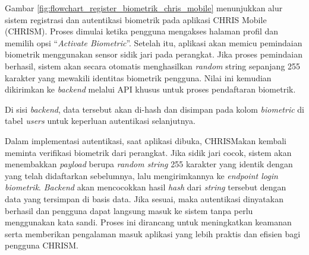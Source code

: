 Gambar \ref{fig:flowchart_register_biometrik_chris_mobile} menunjukkan alur sistem registrasi dan autentikasi biometrik pada aplikasi CHRIS Mobile (CHRISM). Proses dimulai ketika pengguna mengakses halaman profil dan memilih opsi “\textit{Activate Biometric}”. Setelah itu, aplikasi akan memicu pemindaian biometrik menggunakan sensor sidik jari pada perangkat. Jika proses pemindaian berhasil, sistem akan secara otomatis menghasilkan \textit{random} string sepanjang 255 karakter yang mewakili identitas biometrik pengguna. Nilai ini kemudian dikirimkan ke \textit{backend} melalui API khusus untuk proses pendaftaran biometrik.

Di sisi \textit{backend}, data tersebut akan di-hash dan disimpan pada kolom \textit{biometric} di tabel \textit{users} untuk keperluan autentikasi selanjutnya.

Dalam implementasi autentikasi, saat aplikasi dibuka, CHRISM\@ akan kembali meminta verifikasi biometrik dari perangkat. Jika sidik jari cocok, sistem akan menembakkan \textit{payload} berupa \textit{random string} 255 karakter yang identik dengan yang telah didaftarkan sebelumnya, lalu mengirimkannya ke \textit{endpoint login biometrik}. \textit{Backend} akan mencocokkan hasil \textit{hash} dari \textit{string} tersebut dengan data yang tersimpan di basis data. Jika sesuai, maka autentikasi dinyatakan berhasil dan pengguna dapat langsung masuk ke sistem tanpa perlu menggunakan kata sandi. Proses ini dirancang untuk meningkatkan keamanan serta memberikan pengalaman masuk aplikasi yang lebih praktis dan efisien bagi pengguna CHRISM\@.

